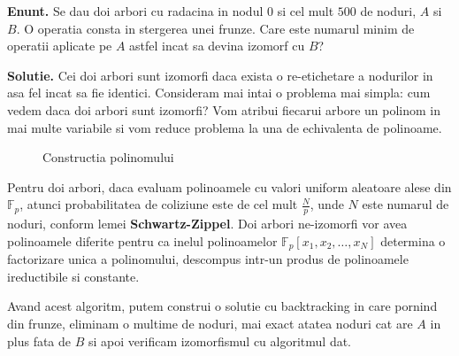 \hspace{1cm}

\noindent \textbf{Enunt.} Se dau doi arbori cu radacina in nodul $0$ si cel mult $500$ de noduri, $A$ si $B$.
O operatia consta in stergerea unei frunze. Care este numarul minim de operatii aplicate pe $A$ astfel incat
sa devina izomorf cu $B$?

\noindent \textbf{Solutie.} Cei doi arbori sunt izomorfi daca exista o re-etichetare a nodurilor in asa fel incat sa fie identici.
Consideram mai intai o problema mai simpla: cum vedem daca doi arbori sunt izomorfi? Vom atribui fiecarui arbore un polinom in mai
multe variabile si vom reduce problema la una de echivalenta de polinoame.

\begin{figure}[H]
  \centering
  \caption{Constructia polinomului}
\end{figure}

\begin{algorithm}[H]
  \DontPrintSemicolon
  \;
\end{algorithm}

Pentru doi arbori, daca evaluam polinoamele cu valori uniform aleatoare alese din $\mathbb{F}_{p}$, atunci probabilitatea de coliziune este de
cel mult $\frac{N}{p}$, unde $N$ este numarul de noduri, conform lemei \textbf{Schwartz-Zippel}. Doi arbori ne-izomorfi vor avea polinoamele diferite
pentru ca inelul polinoamelor $\mathbb{F}_{p}[x_{1}, x_{2}, \ldots, x_{N}]$ determina o factorizare unica a polinomului, descompus intr-un produs de
polinoamele ireductibile si constante.

Avand acest algoritm, putem construi o solutie cu backtracking in care pornind din frunze, eliminam o multime de noduri, mai exact atatea
noduri cat are $A$ in plus fata de $B$ si apoi verificam izomorfismul cu algoritmul dat.

